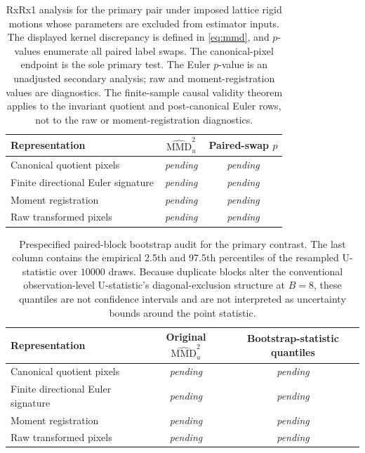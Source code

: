 \documentclass[11pt]{article}
\theoremstyle{definition}
\theoremstyle{remark}
\DeclareMathOperator{\MMD}{MMD}
\newcommand{\1}{\mathbf 1}
\newcommand{\pending}{\textnormal{\textit{pending}}}
\providecommand{\RxCanonicalMMD}{\pending}
\providecommand{\RxCanonicalMMDCI}{\pending}
\providecommand{\RxCanonicalP}{\pending}
\providecommand{\RxEulerMMD}{\pending}
\providecommand{\RxEulerMMDCI}{\pending}
\providecommand{\RxEulerP}{\pending}
\providecommand{\RxRawMMD}{\pending}
\providecommand{\RxRawMMDCI}{\pending}
\providecommand{\RxRawP}{\pending}
\providecommand{\RxMomentMMD}{\pending}
\providecommand{\RxMomentMMDCI}{\pending}
\providecommand{\RxMomentP}{\pending}
\providecommand{\RxBootstrapReplicates}{10000}
\begin{document}
\begin{table}[htbp]
\centering
\caption{RxRx1 analysis for the primary pair under imposed lattice rigid
motions whose parameters are excluded from estimator inputs.  The displayed
kernel discrepancy is defined in
\eqref{eq:mmd}, and \(p\)-values enumerate all paired label swaps.  The
canonical-pixel endpoint is the sole primary test.  The Euler \(p\)-value is an
unadjusted secondary analysis; raw and moment-registration values are
diagnostics.  The finite-sample causal validity theorem applies to the
invariant quotient and post-canonical Euler rows, not to the raw or
moment-registration diagnostics.}
\label{tab:rxrx}
\begin{tabular}{lcc}
\toprule
Representation & \(\widehat{\MMD}_u^2\) & Paired-swap \(p\)\\
\midrule
Canonical quotient pixels
  & \RxCanonicalMMD & \RxCanonicalP\\
Finite directional Euler signature
  & \RxEulerMMD & \RxEulerP\\
Moment registration
  & \RxMomentMMD & \RxMomentP\\
Raw transformed pixels
  & \RxRawMMD & \RxRawP\\
\bottomrule
\end{tabular}
\end{table}

\begin{table}[htbp]
\centering
\caption{Prespecified paired-block bootstrap audit for the primary contrast.
The last column contains the empirical 2.5th and 97.5th percentiles of the
resampled U-statistic over \(\RxBootstrapReplicates\) draws.  Because duplicate
blocks alter the conventional observation-level U-statistic's
diagonal-exclusion structure at \(B=8\), these quantiles are not confidence
intervals and are not interpreted as uncertainty bounds around the point
statistic.}
\label{tab:rxrx-bootstrap-audit}
\begin{tabular}{lcc}
\toprule
Representation & Original \(\widehat{\MMD}_u^2\)
& Bootstrap-statistic quantiles\\
\midrule
Canonical quotient pixels
  & \RxCanonicalMMD & \RxCanonicalMMDCI\\
Finite directional Euler signature
  & \RxEulerMMD & \RxEulerMMDCI\\
Moment registration
  & \RxMomentMMD & \RxMomentMMDCI\\
Raw transformed pixels
  & \RxRawMMD & \RxRawMMDCI\\
\bottomrule
\end{tabular}
\end{table}
\end{document}
